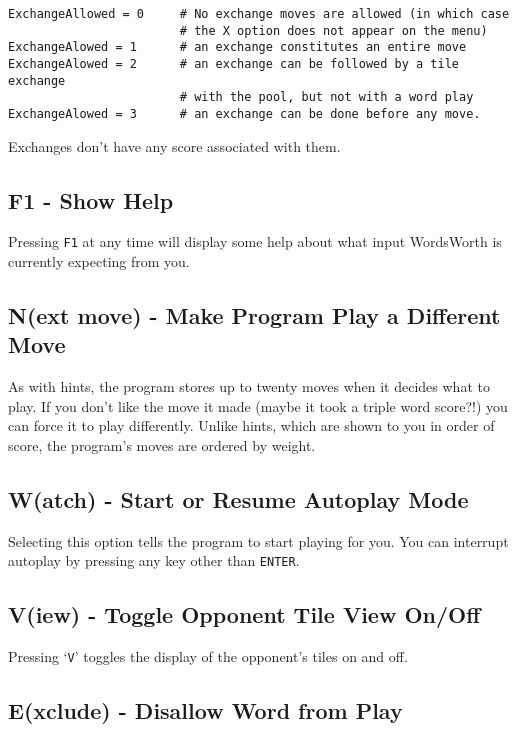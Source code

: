 \begin{verbatim}
ExchangeAllowed = 0     # No exchange moves are allowed (in which case
                        # the X option does not appear on the menu)
ExchangeAlowed = 1      # an exchange constitutes an entire move
ExchangeAlowed = 2      # an exchange can be followed by a tile exchange
                        # with the pool, but not with a word play
ExchangeAlowed = 3      # an exchange can be done before any move.
\end{verbatim}

Exchanges don't have any score associated with them.

\subsection{F1 - Show Help}

Pressing {\tt F1} at any time will display some help
about what input WordsWorth is currently expecting
from you.

\subsection{N(ext move) - Make Program Play a Different Move}

As with hints, the program stores up to twenty moves when it
decides what to play. If you don't like the move it made (maybe it
took a triple word score?!) you can force it to play differently.
Unlike hints, which are shown to you in order of score, the
program's moves are ordered by weight.

\subsection{W(atch) - Start or Resume Autoplay Mode}

Selecting this option tells the program to start playing for you.
You can interrupt autoplay by pressing any key other than {\tt ENTER}.

\subsection{V(iew) - Toggle Opponent Tile View On/Off}

Pressing `{\tt V}' toggles the display of the opponent's tiles on and
off.

\subsection{E(xclude) - Disallow Word from Play}
\label{exclude}

